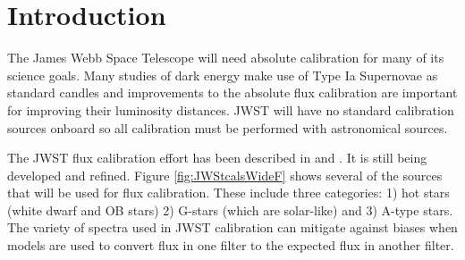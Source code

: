 \documentclass{aastex6}
\begin{document}




\section{Introduction}

The James Webb Space Telescope \citep[JWST; e.g.][]{gardner2006SSRv} will need absolute calibration for many of its science goals.
Many studies of dark energy make use of Type Ia Supernovae as standard candles and improvements to the absolute flux calibration are important for improving their luminosity distances.
JWST will have no standard calibration sources onboard so all calibration must be performed with astronomical sources.

The JWST flux calibration effort has been described in \citet{gordon2009fluxplan1} and \citet{gordon2011fluxplan2}.
It is still being developed and refined.
Figure \ref{fig:JWStcalsWideF} shows several of the sources that will be used for flux calibration.
These include three categories: 1) hot stars (white dwarf and OB stars) 2) G-stars (which are solar-like) and 3) A-type stars.
The variety of spectra used in JWST calibration can mitigate against biases when models are used to convert flux in one filter to the expected flux in another filter.
\end{document}

